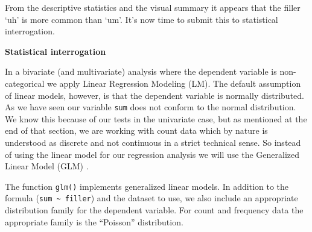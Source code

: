 \documentclass[
]{article}
\begin{document}
From the descriptive statistics and the visual summary it appears that the filler `uh' is more common than `um'. It's now time to submit this to statistical interrogation.

\textbf{Statistical interrogation}

In a bivariate (and multivariate) analysis where the dependent variable is non-categorical we apply Linear Regression Modeling (LM). The default assumption of linear models, however, is that the dependent variable is normally distributed. As we have seen our variable \texttt{sum} does not conform to the normal distribution. We know this because of our tests in the univariate case, but as mentioned at the end of that section, we are working with count data which by nature is understood as discrete and not continuous in a strict technical sense. So instead of using the linear model for our regression analysis we will use the Generalized Linear Model (GLM) \citep{Baayen2008a, Gries2013a}.

The function \texttt{glm()} implements generalized linear models. In addition to the formula (\texttt{sum\ \textasciitilde{}\ filler}) and the dataset to use, we also include an appropriate distribution family for the dependent variable. For count and frequency data the appropriate family is the ``Poisson'' distribution.
\end{document}
